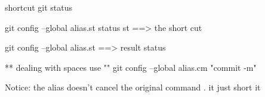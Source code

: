 shortcut 
git status 

git config --global alias.st status     st ==> the short cut 

git config --global alias.st       ==> result    status 

** dealing with spaces 
use ""
git config --global alias.cm "commit -m"


Notice:  the alias doesn't cancel the original command 
.         it just short it 


